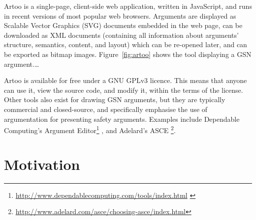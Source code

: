 Artoo is a single-page, client-side web application, written in JavaScript, and runs in recent versions of most popular web browsers.
Arguments are displayed as Scalable Vector Graphics (SVG) documents embedded in the web page, can be downloaded as XML documents (containing all information about arguments' structure, semantics, content, and layout) which can be re-opened later, and can be exported as bitmap images.
Figure~\ref{fig:artoo} shows the tool displaying a GSN argument.\ldots

Artoo is available for free under a GNU GPLv3 licence.
This means that anyone can use it, view the source code, and modify it, within the terms of the license.
Other tools also exist for drawing GSN arguments, but they are typically commercial and closed-source, and specifically emphasise the use of argumentation for presenting safety arguments.
Examples include Dependable Computing's
Argument Editor\footnote{\url{http://www.dependablecomputing.com/tools/index.html} \label{fn:depcomp}}
, and Adelard's
ASCE \footnote{\url{http://www.adelard.com/asce/choosing-asce/index.html}}.


\section{Motivation}

